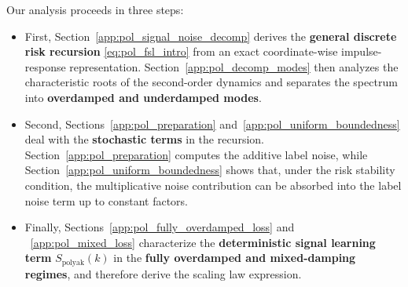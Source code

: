 \documentclass[11pt]{article}
\newcommand{\polyak}{\mathrm{polyak}}
\begin{document}
Our analysis proceeds in three steps:
\begin{itemize}
\item First, Section~\ref{app:pol_signal_noise_decomp} derives the \textbf{general discrete risk recursion} \eqref{eq:pol_fsl_intro} from an exact coordinate-wise impulse-response representation. Section~\ref{app:pol_decomp_modes} then analyzes the characteristic roots of the second-order dynamics and separates the spectrum into \textbf{overdamped and underdamped modes}.

\item Second, Sections~\ref{app:pol_preparation} and~\ref{app:pol_uniform_boundedness} deal with the \textbf{stochastic terms} in the recursion. Section~\ref{app:pol_preparation} computes the additive label noise, while Section~\ref{app:pol_uniform_boundedness} shows that, under the risk stability condition, the multiplicative noise contribution can be absorbed into the label noise term up to constant factors.

\item Finally, Sections~\ref{app:pol_fully_overdamped_loss} and ~\ref{app:pol_mixed_loss} characterize the \textbf{deterministic signal learning term} \(S_{\mathrm{polyak}}(k)\) in the \textbf{fully overdamped and mixed-damping regimes}, and therefore derive the scaling law expression.
\end{itemize}


\end{document}
